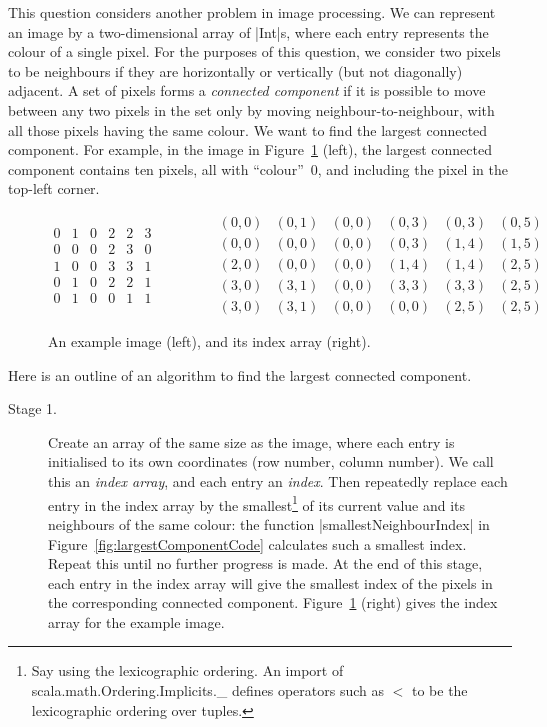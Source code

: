 \begin{question}
This question considers another problem in image processing.  We can represent
an image by a two-dimensional array of |Int|s, where each entry represents the
colour of a single pixel.  For the purposes of this question, we consider two
pixels to be neighbours if they are horizontally or vertically (but not
diagonally) adjacent.  A set of pixels forms a \emph{connected component} if
it is possible to move between any two pixels in the set only by moving
neighbour-to-neighbour, with all those pixels having the same colour.  We want
to find the largest connected component.
For example, in the image in Figure~\ref{fig:image} (left), the largest
connected component contains ten pixels, all with ``colour''~0, and including
the pixel in the top-left corner.


\begin{figure}
\[
\begin{array}{cccccc}
0 & 1 & 0 & 2 & 2 & 3 \\
0 & 0 & 0 & 2 & 3 & 0 \\
1 & 0 & 0 & 3 & 3 & 1 \\
0 & 1 & 0 & 2 & 2 & 1 \\
0 & 1 & 0 & 0 & 1 & 1
\end{array}
\qquad\qquad
\begin{array}{cccccc}
(0,0) & (0,1) & (0,0) & (0,3) & (0,3) & (0,5) \\
(0,0) & (0,0) & (0,0) & (0,3) & (1,4) & (1,5) \\
(2,0) & (0,0) & (0,0) & (1,4) & (1,4) & (2,5) \\
(3,0) & (3,1) & (0,0) & (3,3) & (3,3) & (2,5) \\
(3,0) & (3,1) & (0,0) & (0,0) & (2,5) & (2,5)
\end{array}
\]
\caption{An example image (left), and its index array (right).}
\label{fig:image}
\end{figure}


Here is an outline of an algorithm to find  the largest connected
component.  
%
\begin{description}
\item[Stage 1.] Create an array of the same size as the image, where each
  entry is initialised to its own coordinates (row number, column number).  We
  call this an \emph{index array}, and each entry an \emph{index}.  Then
  repeatedly replace each entry in the index array by the
  smallest\footnote{Say using the lexicographic ordering.  An import of
    {\scalashape scala.math.Ordering.Implicits.\_} defines operators such as
    $<$ to be the lexicographic ordering over tuples.} of its current value
  and its neighbours of the same colour: the function |smallestNeighbourIndex|
  in Figure~\ref{fig:largestComponentCode} calculates such a smallest index.
  Repeat this until no further progress is made.  At the end of this stage,
  each entry in the index array will give the smallest index of the pixels in
  the corresponding connected component.  Figure~\ref{fig:image} (right) gives
  the index array for the example image.


\end{description}
\end{question}
